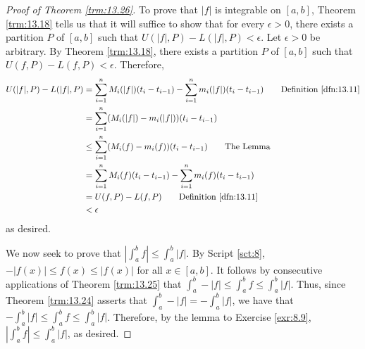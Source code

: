 \documentclass[../main.tex]{subfiles}
\begin{document}
\begin{theorem}
\begin{proof}[Proof of Theorem \ref{trm:13.26}]
        To prove that $|f|$ is integrable on $[a,b]$, Theorem \ref{trm:13.18} tells us that it will suffice to show that for every $\epsilon>0$, there exists a partition $P$ of $[a,b]$ such that $U(|f|,P)-L(|f|,P)<\epsilon$. Let $\epsilon>0$ be arbitrary. By Theorem \ref{trm:13.18}, there exists a partition $P$ of $[a,b]$ such that $U(f,P)-L(f,P)<\epsilon$. Therefore,
        \begin{align*}
            U(|f|,P)-L(|f|,P) &= \sum_{i=1}^nM_i(|f|)(t_i-t_{i-1})-\sum_{i=1}^nm_i(|f|)(t_i-t_{i-1})\tag*{Definition \ref{dfn:13.11}}\\
            &= \sum_{i=1}^n(M_i(|f|)-m_i(|f|))(t_i-t_{i-1})\\
            &\leq \sum_{i=1}^n(M_i(f)-m_i(f))(t_i-t_{i-1})\tag*{The Lemma}\\
            &= \sum_{i=1}^nM_i(f)(t_i-t_{i-1})-\sum_{i=1}^nm_i(f)(t_i-t_{i-1})\\
            &= U(f,P)-L(f,P)\tag*{Definition \ref{dfn:13.11}}\\
            &< \epsilon
        \end{align*}
        as desired.\par
        We now seek to prove that $|\int_a^bf|\leq\int_a^b|f|$. By Script \ref{sct:8}, $-|f(x)|\leq f(x)\leq |f(x)|$ for all $x\in[a,b]$. It follows by consecutive applications of Theorem \ref{trm:13.25} that $\int_a^b-|f|\leq\int_a^bf\leq\int_a^b|f|$. Thus, since Theorem \ref{trm:13.24} asserts that $\int_a^b-|f|=-\int_a^b|f|$, we have that $-\int_a^b|f|\leq\int_a^bf\leq\int_a^b|f|$. Therefore, by the lemma to Exercise \ref{exr:8.9}, $|\int_a^bf|\leq\int_a^b|f|$, as desired.
    \end{proof}
\end{theorem}
\end{document}
